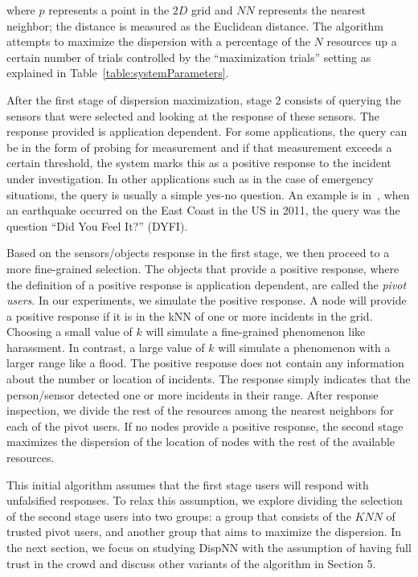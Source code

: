 \documentclass{acm_proc_article-sp}
\begin{document}
where $p$ represents a point in the $2D$ grid and $NN$ represents the nearest neighbor; the distance is measured as the Euclidean distance. The algorithm attempts to maximize the dispersion with a percentage of the $N$ resources up a certain number of trials controlled by the ``maximization trials'' setting as explained in Table~\ref{table:systemParameters}. \par
After the first stage of dispersion maximization, stage 2 consists of querying the sensors that were selected and looking at the response of these sensors. The response provided is application dependent. For some applications, the query can be in the form of probing for measurement and if that measurement exceeds a certain threshold, the system marks this as a positive response to the incident under investigation. In other applications such as in the case of emergency situations, the query is usually a simple yes-no question. An example is in~\cite{crooks2013earthquake}, when an earthquake occurred on the East Coast in the US in 2011, the query was the question ``Did You Feel It?'' (DYFI).\par
 Based on the sensors/objects response in the first stage, we then proceed to a more fine-grained selection. The objects that provide a positive response, where the definition of a positive response is application dependent, are called the \textit{pivot users}. In our experiments, we simulate the positive response. A node will provide a positive response if it is in the kNN of one or more incidents in the grid. Choosing a small value of $k$ will simulate a fine-grained phenomenon like harassment. In contrast, a large value of $k$ will simulate a phenomenon with a larger range like a flood. The positive response does not contain any information about the number or location of incidents. The response simply indicates that the person/sensor detected one or more incidents in their range. After response inspection, we divide the rest of the resources among the nearest neighbors for each of the pivot users. If no nodes provide a positive response, the second stage maximizes the dispersion of the location of nodes with the rest of the available resources. \par

This initial algorithm assumes that the first stage users will respond with unfalsified responses. To relax this assumption, we explore dividing the selection of the second stage users into two groups: a group that consists of the $KNN$ of trusted pivot users, and another group that aims to maximize the dispersion. In the next section, we focus on studying DispNN with the assumption of having full trust in the crowd and discuss other variants of the algorithm in Section 5.\par
\end{document}
